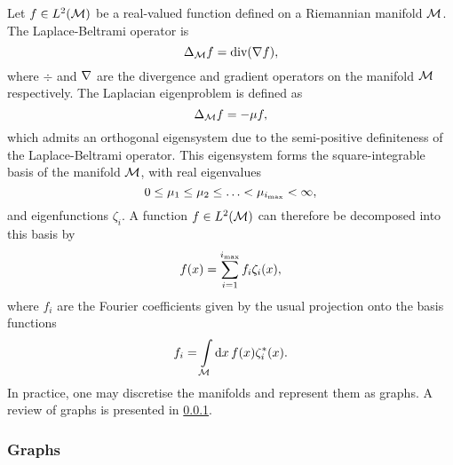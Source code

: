 Let \(f \in L^{2}(\mathcal{M})\) be a real-valued function defined on a Riemannian manifold \(\mathcal{M}{}\).
The Laplace-Beltrami operator is
%
\begin{equation}
	\Delta_{\mathcal{M}} f
	= \text{div}(\nabla f),
\end{equation}
%
where \(\div{}\) and \(\nabla\) are the divergence and gradient operators on the manifold \(\mathcal{M}{}\) respectively.
The Laplacian eigenproblem is defined as
%
\begin{equation}
	\Delta_{\mathcal{M}} f
	= -\mu f,
\end{equation}
%
which admits an orthogonal eigensystem due to the semi-positive definiteness of the Laplace-Beltrami operator.
This eigensystem forms the square-integrable basis of the manifold \(\mathcal{M}{}\), with real eigenvalues
%
\begin{equation}
	0 \leq \mu_{1} \leq \mu_{2} \leq \ldots < \mu_{\imax} < \infty, %
\end{equation}
%
and eigenfunctions \(\zeta_{i}\).
A function \(f \in L^{2}(\mathcal{M})\) can therefore be decomposed into this basis by
%
\begin{equation}
	f(x)
	= \sum\limits_{i=1}^{i_{\text{max}}} f_{i} \zeta_{i}(x),
\end{equation}
%
where \(f_{i}\) are the Fourier coefficients given by the usual projection onto the basis functions
%
\begin{equation}
	f_{i}
	= \displaystyle\int\limits_{\mathcal{M}} \dd{x} f(x) \zeta_{i}^{\ast}(x).
\end{equation}
%
In practice, one may discretise the manifolds and represent them as graphs.
A review of graphs is presented in \cref{sec:chapter5_graphs}.

\subsubsection{Graphs}\label{sec:chapter5_graphs}

